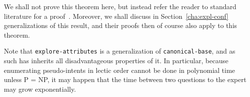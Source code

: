 We shall not prove this theorem here, but instead refer the reader to standard literature
for a proof~\cite{fca-book,Diss-Felix,stumme96attribute,DBLP:journals/tcs/Ganter99}.
Moreover, we shall discuss in Section~\ref{cha:expl-conf} generalizations of this result,
and their proofs then of course also apply to this theorem.

Note that \lstinline{explore-attributes} is a generalization of
\lstinline{canonical-base}, and as such has inherits all disadvantageous properties of it.
In particular, because enumerating pseudo-intents in lectic order cannot be done in
polynomial time unless P = NP, it may happen that the time between two questions to the
expert may grow exponentially.


